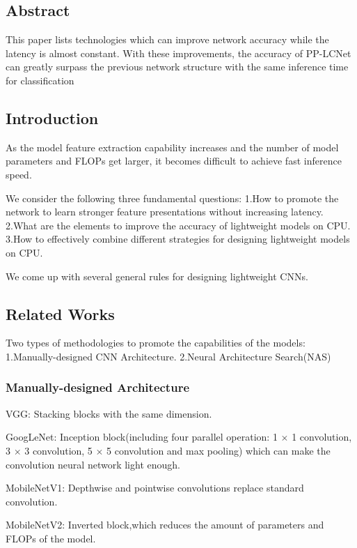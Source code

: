 \documentclass[11pt]{article}
\begin{document}
\subsection{Abstract}

This paper lists technologies which can improve network accuracy while the latency is almost constant. With these improvements, the accuracy of PP-LCNet can greatly surpass the previous network structure with the same inference time for classification

\subsection{Introduction}

As the model feature extraction capability increases and the number of model parameters and FLOPs get larger, it becomes difficult to achieve fast inference speed.

We consider the following three fundamental questions:
\noindent1.How to promote the network to learn stronger feature presentations without increasing latency.
\noindent2.What are the elements to improve the accuracy of lightweight models on CPU.
\noindent3.How to effectively combine different strategies for designing lightweight models on CPU.

We come up with several general rules for designing lightweight CNNs.

\subsection{Related Works}

Two types of methodologies to promote the capabilities of the models:
\noindent1.Manually-designed CNN Architecture.
\noindent2.Neural Architecture Search(NAS)

\subsubsection{Manually-designed Architecture}

VGG: Stacking blocks with the same dimension.

GoogLeNet: Inception block(including four parallel operation: 1 $\times$ 1 convolution, 3 $\times$ 3 convolution, 5 $\times$ 5 convolution and max pooling) which can make the convolution neural network light enough.

MobileNetV1: Depthwise and pointwise convolutions replace standard convolution.

MobileNetV2: Inverted block,which reduces the amount of parameters and FLOPs of the model.
\end{document}
